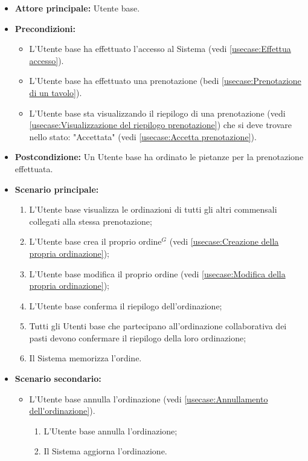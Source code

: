\begin{itemize}
	\item \textbf{Attore principale:} Utente base.

	\item \textbf{Precondizioni:}
	      \begin{itemize}
		      \item L'Utente base ha effettuato l'accesso al Sistema (vedi \autoref{usecase:Effettua accesso}).
		      \item L'Utente base ha effettuato una prenotazione (bedi \autoref{usecase:Prenotazione di un tavolo}).
		      \item L'Utente base sta visualizzando il riepilogo di una prenotazione (vedi \autoref{usecase:Visualizzazione del riepilogo prenotazione}) che si deve trovare nello stato: "Accettata"  (vedi \autoref{usecase:Accetta prenotazione}).
	      \end{itemize}

	\item \textbf{Postcondizione:} Un Utente base ha ordinato le pietanze per la prenotazione effettuata.

	\item \textbf{Scenario principale:}
	      \begin{enumerate}
		      \item L'Utente base visualizza le ordinazioni di tutti gli altri commensali collegati alla stessa prenotazione;
		      \item L'Utente base crea il proprio ordine$^G$ (vedi \autoref{usecase:Creazione della propria ordinazione});
		      \item L'Utente base modifica il proprio ordine (vedi \autoref{usecase:Modifica della propria ordinazione});

		      \item L'Utente base conferma il riepilogo dell'ordinazione;

		      \item Tutti gli Utenti base che partecipano all'ordinazione collaborativa dei pasti devono
		            confermare il riepilogo della loro ordinazione;
		      \item Il Sistema memorizza l'ordine.
	      \end{enumerate}

	\item \textbf{Scenario secondario:}
	      \begin{itemize}
		      \item L'Utente base annulla l'ordinazione (vedi
		            \autoref{usecase:Annullamento dell'ordinazione}).
		            \begin{enumerate}
			            \item L'Utente base annulla l'ordinazione;
			            \item Il Sistema aggiorna l'ordinazione.
		            \end{enumerate}
	      \end{itemize}
\end{itemize}


